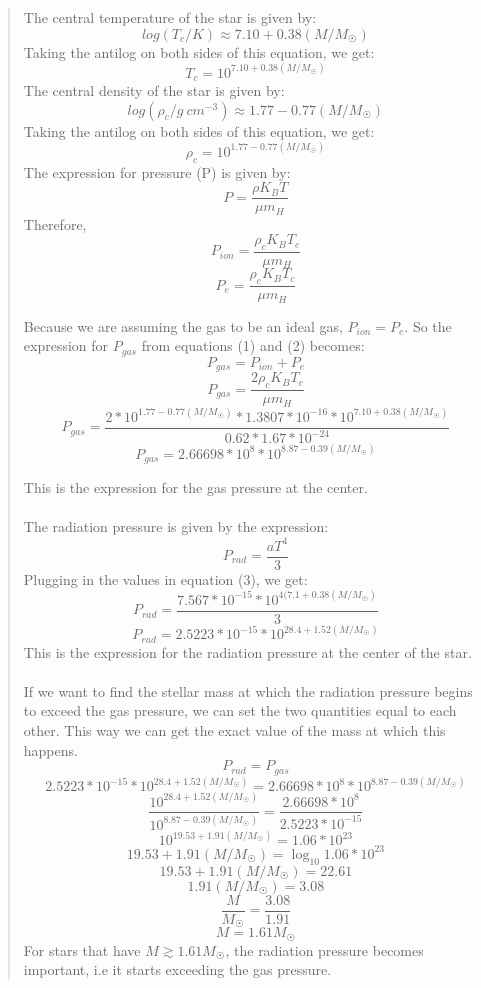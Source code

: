 \documentclass[10pt]{article}
\begin{document}
\begin{quote}
The central temperature of the star is given by:
\[ log(T_c/K) \approx 7.10 + 0.38 (M/M_{\astrosun}) \]
Taking the antilog on both sides of this equation, we get:
\[ T_{c} = 10^{7.10 + 0.38(M/M_{\astrosun})}\]
The central density of the star is given by:
\[ log(\rho_c/g\ cm^{-3}) \approx 1.77 - 0.77 (M/M_{\astrosun}) \]
Taking the antilog on both sides of this equation, we get:
\[ \rho_{c} = 10^{1.77 - 0.77(M/M_{\astrosun})}\]
The expression for pressure (P) is given by:
\[ P = \frac{\rho K_{B} T}{\mu m_{H}}\]
Therefore, 
\begin{equation}
    P_{ion} = \frac{\rho_{c} K_{B} T_{c}}{\mu m_{H}} \tag{1}
\end{equation}
\begin{equation}
    P_{e} = \frac{\rho_{c} K_{B} T_{c}}{\mu m_{H}} \tag{2}
\end{equation}

Because we are assuming the gas to be an ideal gas, $P_{ion} = P_{e}$. So the expression for $P_{gas}$ from equations (1) and (2) becomes:
\[ P_{gas} = P_{ion} + P_{e}\]
\[ P_{gas} = \frac{2 \rho_{c} K_{B} T_{c}}{\mu m_{H}}\]
\[ P_{gas} = \frac{2*10^{1.77 - 0.77(M/M_{\astrosun})} * 1.3807 * 10^{-16} * 10^{7.10 + 0.38(M/M_{\astrosun})}}{0.62 * 1.67 * 10^{-24}}\]
\[ P_{gas} = 2.66698 * 10^8 * 10^{8.87 - 0.39(M/M_{\astrosun})}\]

This is the expression for the gas pressure at the center.\\ \\
The radiation pressure is given by the expression:
\begin{equation}
    P_{rad} = \frac{aT^4}{3}  \tag{3}
\end{equation}
Plugging in the values in equation (3), we get:
\[ P_{rad} = \frac{7.567 * 10^{-15} * 10^{4(7.1 + 0.38(M/M_{\astrosun})}}{3} \]
\[ P_{rad} = 2.5223 * 10^{-15} * 10^{28.4 + 1.52(M/M_{\astrosun})} \]
This is the expression for the radiation pressure at the center of the star.\\ \\
If we want to find the stellar mass at which the radiation pressure begins to exceed the gas pressure, we can set the two quantities equal to each other. This way we can get the exact value of the mass at which this happens.
\[ P_{rad} = P_{gas}\]
\[ 2.5223 * 10^{-15} * 10^{28.4 + 1.52(M/M_{\astrosun})} = 2.66698 * 10^8 * 10^{8.87 - 0.39(M/M_{\astrosun})} \]
\[ \frac{10^{28.4 + 1.52(M/M_{\astrosun})}}{10^{8.87 - 0.39(M/M_{\astrosun})}} = \frac{2.66698 * 10^8}{2.5223 * 10^{-15}}\]
\[ 10^{19.53 + 1.91(M/M_{\astrosun})} = 1.06 * 10^{23}\]
\[ 19.53 + 1.91(M/M_{\astrosun}) = \log_{10}{1.06*10^{23}}\]
\[ 19.53 + 1.91(M/M_{\astrosun}) = 22.61\]
\[ 1.91(M/M_{\astrosun}) = 3.08\]
\[ \frac{M}{M_{\astrosun}} = \frac{3.08}{1.91}\]
\[ M = 1.61 M_{\astrosun}\]
For stars that have $M \gtrsim 1.61M_{\astrosun}$, the radiation pressure becomes important, i.e it starts exceeding the gas pressure. 
\end{quote}
\end{document}
